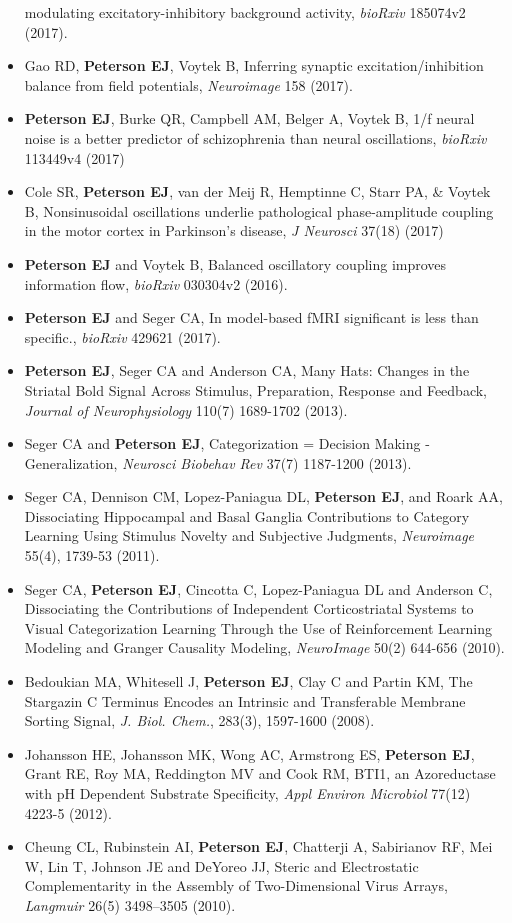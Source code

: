 \begin{itemize}
  modulating excitatory-inhibitory background activity, \emph{bioRxiv}
  185074v2 (2017).
\item
  Gao RD, \textbf{Peterson EJ}, Voytek B, Inferring synaptic
  excitation/inhibition balance from field potentials, \emph{Neuroimage}
  158 (2017).
\item
  \textbf{Peterson EJ}, Burke QR, Campbell AM, Belger A, Voytek B, 1/f
  neural noise is a better predictor of schizophrenia than neural
  oscillations, \emph{bioRxiv} 113449v4 (2017)
\item
  Cole SR, \textbf{Peterson EJ}, van der Meij R, Hemptinne C, Starr PA,
  \& Voytek B, Nonsinusoidal oscillations underlie pathological
  phase-amplitude coupling in the motor cortex in Parkinson's disease,
  \emph{J Neurosci} 37(18) (2017)
\item
  \textbf{Peterson EJ} and Voytek B, Balanced oscillatory coupling
  improves information flow, \emph{bioRxiv} 030304v2 (2016).
\item
  \textbf{Peterson EJ} and Seger CA, In model-based fMRI significant is
  less than specific., \emph{bioRxiv} 429621 (2017).
\item
  \textbf{Peterson EJ}, Seger CA and Anderson CA, Many Hats: Changes in
  the Striatal Bold Signal Across Stimulus, Preparation, Response and
  Feedback, \emph{Journal of Neurophysiology} 110(7) 1689-1702 (2013).
\item
  Seger CA and \textbf{Peterson EJ}, Categorization = Decision Making -
  Generalization, \emph{Neurosci Biobehav Rev} 37(7) 1187-1200 (2013).
\item
  Seger CA, Dennison CM, Lopez-Paniagua DL, \textbf{Peterson EJ}, and
  Roark AA, Dissociating Hippocampal and Basal Ganglia Contributions to
  Category Learning Using Stimulus Novelty and Subjective Judgments,
  \emph{Neuroimage} 55(4), 1739-53 (2011).
\item
  Seger CA, \textbf{Peterson EJ}, Cincotta C, Lopez-Paniagua DL and
  Anderson C, Dissociating the Contributions of Independent
  Corticostriatal Systems to Visual Categorization Learning Through the
  Use of Reinforcement Learning Modeling and Granger Causality Modeling,
  \emph{NeuroImage} 50(2) 644-656 (2010).
\item
  Bedoukian MA, Whitesell J, \textbf{Peterson EJ}, Clay C and Partin KM,
  The Stargazin C Terminus Encodes an Intrinsic and Transferable
  Membrane Sorting Signal, \emph{J. Biol. Chem.}, 283(3), 1597-1600
  (2008).
\item
  Johansson HE, Johansson MK, Wong AC, Armstrong ES, \textbf{Peterson
  EJ}, Grant RE, Roy MA, Reddington MV and Cook RM, BTI1, an
  Azoreductase with pH Dependent Substrate Specificity, \emph{Appl
  Environ Microbiol} 77(12) 4223-5 (2012).
\item
  Cheung CL, Rubinstein AI, \textbf{Peterson EJ}, Chatterji A,
  Sabirianov RF, Mei W, Lin T, Johnson JE and DeYoreo JJ, Steric and
  Electrostatic Complementarity in the Assembly of Two-Dimensional Virus
  Arrays, \emph{Langmuir} 26(5) 3498--3505 (2010).
\end{itemize}


